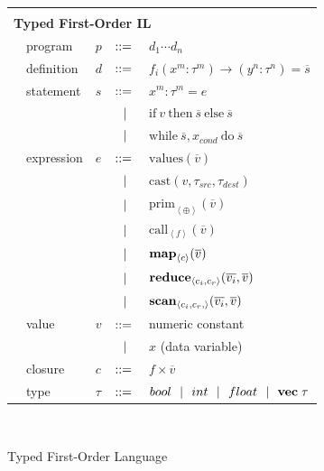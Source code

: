 \documentclass[10pt,twocolumn]{article}
\begin{document}
\begin{figure}[h!]
  \begin{tabular}{| m{0.01cm}m{1.3cm}m{0.1cm}m{0.2cm}p{5.0cm} |}
  \hline
    & & & &\\
   \multicolumn{5}{|l|}{\textbf{Typed First-Order IL}}  \\[4pt]
  & program & $p$ &  $::=$   &  $d_1 \cdots d_n $ \\[4pt]
  & definition & $d$ & $::=$ & $f_i(x^m : \tau^m) \rightarrow (y^n : \tau^n) = \overline{s} $ \\[4pt]
  & statement  & $s$ & $::=$ & $x^m : \tau^m = e $\\[2pt]
  &            &     & $\ \ | \ \ $    & $\mathrm{if} ~v~ \mathrm{then} ~\overline{s}~ \mathrm{else} ~ \overline{s}$ \\[2pt]
  &            &     & $\ \ | \ \ $    & $\mathrm{while} ~ \overline{s}, x_{cond} ~ \mathrm{do} ~ \overline{s} ~  $ \\[4pt]
  & expression & $e$ & $::=$ & $\mathrm{values}(\overline{v})$ \\[2pt]
  &            &     & $\ \ | \ \ $    & $\mathrm{cast} (v, \tau_{src}, \tau_{dest})$ \\[2pt]
  &            &     & $\ \ | \ \ $    & $\mathrm{prim}_{\left\langle \oplus \right\rangle }(\overline{v})$ \\[2pt]
  &            &     & $\ \ | \ \ $    & $\mathrm{call}_{\left\langle f  \right\rangle } (\overline{v})$ \\[2pt] 
  
  &            &     & $\ \ | \ \ $    & $\mbox{\textbf{map}} _{\left\langle c \right\rangle}(\overline{v})$ \\[2pt]
  &            &     & $\ \ | \ \ $    & $\mbox{\textbf{reduce}} _{ \left\langle c_i, c_r \right\rangle } (\overline{v_i}, \overline{v})$ \\[2pt]
  &            &     & $\ \ | \ \ $    & $\mbox{\textbf{scan}} _{ \left\langle c_i, c_r, \right\rangle} (\overline{v_i}, \overline{v})$ \\[5pt]
  & value      & $v$ & $::=$ & numeric constant \\[2pt]
  &            &     & $\ \ | \ \ $    &  $x$  \quad \small{(data variable)} \\[2pt]
  & closure    & $c$ & $::=$ & $f \times \overline{v}$ \\[4pt]
  & type & $\tau$    & $::=$ & $bool \ \ | \ \  int \ \ | \ \  float \ \ | \ \  \mathbf{vec} \; \tau   $\\[5pt]
  \hline
  \end{tabular}\\[4pt]
  \caption{Typed First-Order Language}
  \label{TIL}
\end{figure} 
\end{document}
